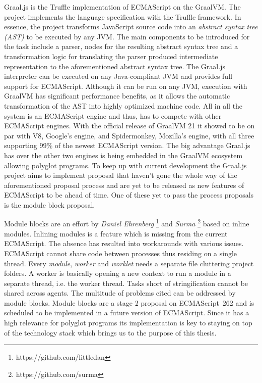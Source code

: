Graal.js is the Truffle implementation of ECMAScript on the GraalVM. The project implements the language specification with the Truffle framework. In essence, the project transforms JavaScript source code into an \emph{abstract syntax tree (AST)} to be executed by any JVM. \cite{Graaljs} The main components to be introduced for the task include a parser, nodes for the resulting abstract syntax tree and a transformation logic for translating the parser produced intermediate representation to the aforementioned abstract syntax tree. The Graal.js interpreter can be executed on any Java-compliant JVM and provides full support for ECMAScript. Although it can be run on any JVM, execution with GraalVM has significant performance benefits, as it allows the automatic transformation of the AST into highly optimized machine code. All in all the system is an ECMAScript engine and thus, has to compete with other ECMAScript engines. With the official release of GraalVM 21 it showed to be on par with V8, Google's engine, and Spidermonkey, Mozilla's engine, with all three supporting 99\% of the newest ECMAScript version. \cite{kangax1} The big advantage Graal.js has over the other two engines is being embedded in the GraalVM ecosystem allowing polyglot programs. To keep up with current development the Graal.js project aims to implement proposal that haven't gone the whole way of the aforementioned proposal process and are yet to be released as new features of ECMAScript to be ahead of time. One of these yet to pass the process proposals is the module block proposal.

Module blocks are an effort by \emph{Daniel Ehrenberg} \footnote{https://github.com/littledan} and \emph{Surma} \footnote{https://github.com/surma} based on inline modules. Inlining modules is a feature which is missing from the current ECMAScript. The absence has resulted into workarounds with various issues. ECMAScript cannot share code between processes thus residing on a single thread. Every \emph{module}, \emph{worker} and \emph{worklet} needs a separate file cluttering project folders. A worker is basically opening a new context to run a module in a separate thread, i.e. the worker thread. \cite{workers} Tasks short of stringification cannot be shared across agents. The multitude of problems cited can be addressed by module blocks. Module blocks are a stage 2 proposal on ECMAScript~262 and is scheduled to be implemented in a future version of ECMAScript. \cite{gitMB} Since it has a high relevance for polyglot programs its implementation is key to staying on top of the technology stack which brings us to the purpose of this thesis.

